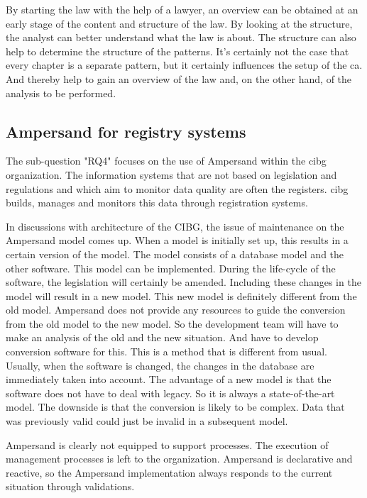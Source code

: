 By starting the law with the help of a lawyer, an overview can be obtained at an early stage of the content and structure of the law.
By looking at the structure, the analyst can better understand what the law is about.
The structure can also help to determine the structure of the patterns.
It's certainly not the case that every chapter is a separate pattern, but it certainly influences the setup of the \acrlong{ca}.
And thereby help to gain an overview of the law and, on the other hand, of the analysis to be performed.


\subsection{Ampersand for registry systems}\label{subsection:ampersand-for-registry-systems}
The sub-question "\acrlong{RQ4}" focuses on the use of Ampersand within the \acrshort{cibg} organization.
The information systems that are not based on legislation and regulations and which aim to monitor data quality are often the registers.
\acrshort{cibg} builds, manages and monitors this data through registration systems.

In discussions with architecture of the CIBG, the issue of maintenance on the Ampersand model comes up.
When a model is initially set up, this results in a certain version of the model.
The model consists of a database model and the other software.
This model can be implemented.
During the life-cycle of the software, the legislation will certainly be amended.
Including these changes in the model will result in a new model.
This new model is definitely different from the old model.
Ampersand does not provide any resources to guide the conversion from the old model to the new model.
So the development team will have to make an analysis of the old and the new situation.
And have to develop conversion software for this.
This is a method that is different from usual.
Usually, when the software is changed, the changes in the database are immediately taken into account.
The advantage of a new model is that the software does not have to deal with legacy.
So it is always a state-of-the-art model.
The downside is that the conversion is likely to be complex.
Data that was previously valid could just be invalid in a subsequent model.

Ampersand is clearly not equipped to support processes.
The execution of management processes is left to the organization.
Ampersand is declarative and reactive, so the Ampersand implementation always responds to the current situation through validations.

